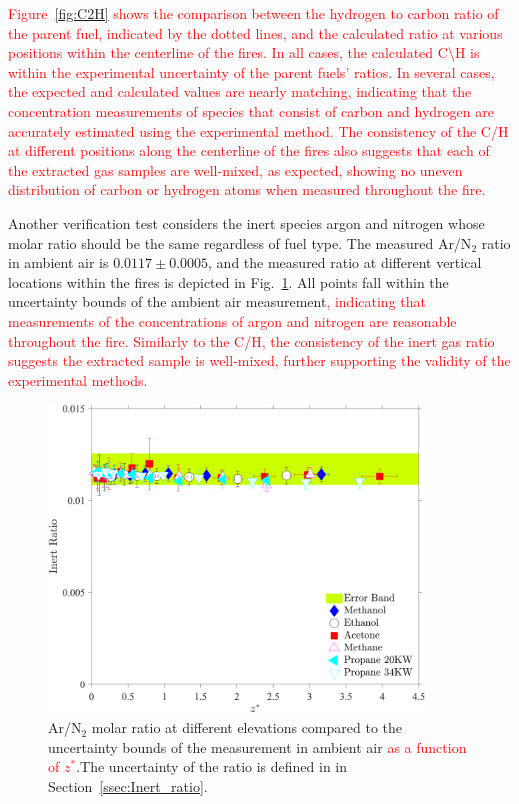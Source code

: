 \documentclass[12pt]{article}
\begin{document}
\textcolor{red}{Figure~\ref{fig:C2H} shows the comparison between the hydrogen to carbon ratio of the parent fuel, indicated by the dotted lines, and the calculated ratio at various positions within the centerline of the fires. In all cases, the calculated {C}\textbackslash{H} is within the experimental uncertainty of the parent fuels' ratios. In several cases, the expected and calculated values are nearly matching, indicating that the concentration measurements of species that consist of carbon and hydrogen are accurately estimated using the experimental method. The consistency of the {C}/{H} at different positions along the centerline of the fires also suggests that each of the extracted gas samples are well-mixed, as expected, showing no uneven distribution of carbon or hydrogen atoms when measured throughout the fire.}

Another verification test considers the inert species argon and nitrogen whose molar ratio should be the same regardless of fuel type. The measured Ar/N$_2$ ratio in ambient air is $0.0117\pm0.0005$, and the measured ratio at different vertical locations within the fires is depicted in Fig.~\ref{fig:IR}. All points fall within the uncertainty bounds of the ambient air measurement\textcolor{red}{, indicating that measurements of the concentrations of argon and nitrogen are reasonable throughout the fire. Similarly to the {C}/{H}, the consistency of the inert gas ratio suggests the extracted sample is well-mixed, further supporting the validity of the experimental methods.}
 
\begin{figure}[h!]
	\centering
\includegraphics[width=10.0cm, keepaspectratio]{Inert_ratio_Comparison.pdf}
	\caption[Ar/N$_2$ ratio within the fire envelop compared to ambient air]{Ar/N$_2$ molar ratio at different elevations compared to the uncertainty bounds of the measurement in ambient air \textcolor{red}{ as a function of $z^*$}.The uncertainty of the ratio is defined in in Section~\ref{ssec:Inert_ratio}.}
	\label{fig:IR}
\end{figure}
\clearpage
\end{document}
